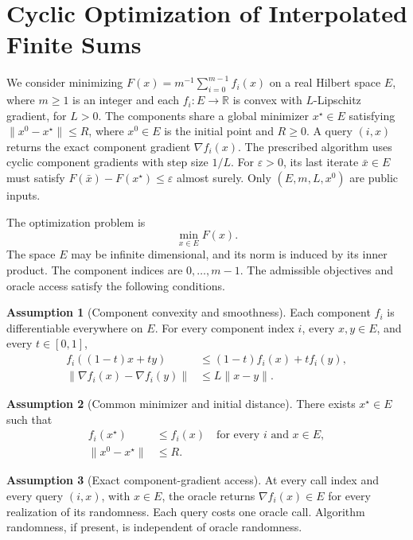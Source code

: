 \documentclass[10pt]{article}
\theoremstyle{definition}
\newtheorem{assumption}{Assumption}
\begin{document}
\section*{Cyclic Optimization of Interpolated Finite Sums}
We consider minimizing $F(x)=m^{-1}\sum_{i=0}^{m-1}f_i(x)$ on a real Hilbert space $E$, where $m\geq1$ is an integer and each $f_i:E\to\mathbb{R}$ is convex with $L$-Lipschitz gradient, for $L>0$. The components share a global minimizer $x^\star\in E$ satisfying $\|x^0-x^\star\|\leq R$, where $x^0\in E$ is the initial point and $R\geq0$. A query $(i,x)$ returns the exact component gradient $\nabla f_i(x)$. The prescribed algorithm uses cyclic component gradients with step size $1/L$. For $\varepsilon>0$, its last iterate $\bar{x}\in E$ must satisfy $F(\bar{x})-F(x^\star)\leq\varepsilon$ almost surely. Only $(E,m,L,x^0)$ are public inputs.

The optimization problem is
\[
\min_{x\in E} F(x).
\]
The space $E$ may be infinite dimensional, and its norm is induced by its inner product. The component indices are $0,\ldots,m-1$. The admissible objectives and oracle access satisfy the following conditions.

\begin{assumption}[Component convexity and smoothness]
Each component $f_i$ is differentiable everywhere on $E$. For every component index $i$, every $x,y\in E$, and every $t\in[0,1]$,
\begin{align*}
f_i((1-t)x+ty) &\leq (1-t)f_i(x)+tf_i(y),\\
\|\nabla f_i(x)-\nabla f_i(y)\| &\leq L\|x-y\|.
\end{align*}
\end{assumption}

\begin{assumption}[Common minimizer and initial distance]
There exists $x^\star\in E$ such that
\begin{align*}
f_i(x^\star) &\leq f_i(x)
\quad\text{for every }i\text{ and }x\in E,\\
\|x^0-x^\star\| &\leq R.
\end{align*}
\end{assumption}

\begin{assumption}[Exact component-gradient access]
At every call index and every query $(i,x)$, with $x\in E$, the oracle returns $\nabla f_i(x)\in E$ for every realization of its randomness. Each query costs one oracle call. Algorithm randomness, if present, is independent of oracle randomness.
\end{assumption}
\end{document}
